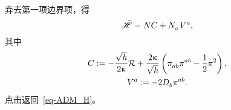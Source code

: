 \begin{Proof}
\begin{equation}
\begin{split}
				\end{split}
			\end{equation}
			弃去第一项边界项，得
			\begin{equation}
				\Had = N C + \tensor{N}{_a} \tensor{V}{^a},
			\end{equation}
			其中
			\begin{gather}
				C \definedby - \frac{\sqrt{h}}{2\gkappa} \spacecurR + \frac{2\gkappa}{\sqrt{h}} \left( \tensor{\pi}{_a_b} \tensor{\pi}{^a^b} - \frac{1}{2} \pi^2 \right),\\
				\tensor{V}{^a} \definedby -2 \spaceD{b} \tensor{\pi}{^a^b}.
			\end{gather}
			{\normalfont\ttfamily\color{green} 点击返回~\eqref{eq-ADM_H}。}
		\end{Proof}

